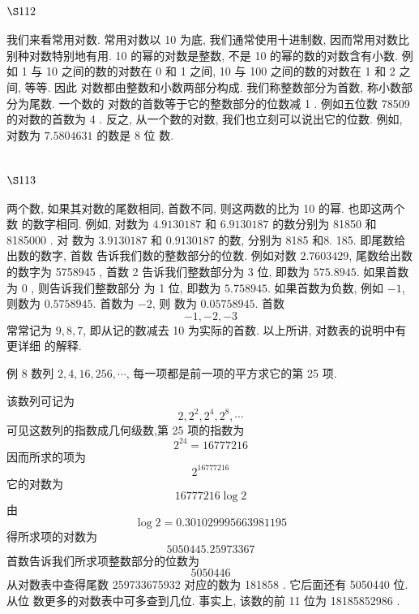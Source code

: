 \section{$\S 112$}

我们来看常用对数. 常用对数以 10 为底, 我们通常使用十进制数, 因而常用对数比 别种对数特别地有用. 10 的幂的对数是整数, 不是 10 的幂的数的对数含有小数. 例如 1 与 10 之间的数的对数在 0 和 1 之间, 10 与 100 之间的数的对数在 1 和 2 之间, 等等. 因此 对数都由整数和小数两部分构成. 我们称整数部分为首数, 称小数部分为尾数. 一个数的 对数的首数等于它的整数部分的位数减 1 . 例如五位数 78509 的对数的首数为 4 . 反之, 从一个数的对数, 我们也立刻可以说出它的位数. 例如, 对数为 $7.5804631$ 的数是 8 位 数.

\section{$\S 113$}

两个数, 如果其对数的尾数相同, 首数不同, 则这两数的比为 10 的幂. 也即这两个数 的数字相同. 例如, 对数为 $4.9130187$ 和 $6.9130187$ 的数分别为 81850 和 8185000 . 对 数为 $3.9130187$ 和 $0.9130187$ 的数, 分别为 8185 和8. 185. 即尾数给出数的数字, 首数 告诉我们数的整数部分的位数. 例如对数 $2.7603429$, 尾数给出数的数字为 5758945 , 首数 2 告诉我们整数部分为 3 位, 即数为 $575.8945$. 如果首数为 0 , 则告诉我们整数部分 为 1 位, 即数为 $5.758945$. 如果首数为负数, 例如 $-1$, 则数为 $0.5758945$. 首数为 $-2$, 则 数为 $0.05758945$. 首数
\[
-1,-2,-3
\]
常常记为 $9,8,7$, 即从记的数减去 10 为实际的首数. 以上所讲, 对数表的说明中有更详细 的解释.

例 8 数列 $2,4,16,256, \cdots$, 每一项都是前一项的平方求它的第 25 项.

该数列可记为
\[
2,2^{2}, 2^{4}, 2^{8}, \cdots
\]
可见这数列的指数成几何级数,第 25 项的指数为
\[
2^{24}=16777216
\]
因而所求的项为
\[
2^{16777216}
\]
它的对数为
\[
16777216 \log 2
\]
由
\[
\log 2=0.301029995663981195
\]
得所求项的对数为
\[
5050445.25973367
\]
首数告诉我们所求项整数部分的位数为
\[
5050446
\]
从对数表中查得尾数 259733675932 对应的数为 181858 . 它后面还有 5050440 位. 从位 数更多的对数表中可多查到几位. 事实上, 该数的前 11 位为 18185852986 . 

